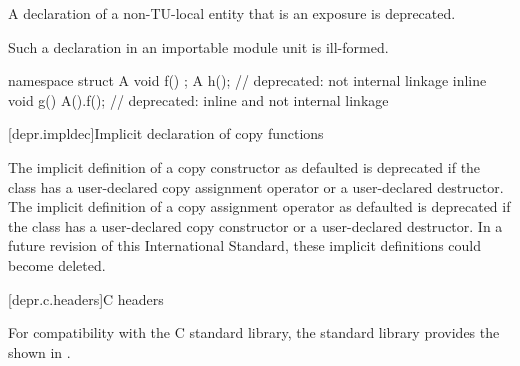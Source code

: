 \pnum
A declaration of a non-TU-local entity that is an exposure
is deprecated.
\begin{note}
Such a declaration in an importable module unit is ill-formed.
\end{note}
\begin{example}
\begin{codeblock}
namespace {
  struct A {
    void f() {}
  };
}
A h();                          // deprecated: not internal linkage
inline void g() {A().f();}      // deprecated: inline and not internal linkage
\end{codeblock}
\end{example}

[depr.impldec]{Implicit declaration of copy functions}

\pnum
The implicit definition of a copy constructor
as defaulted is deprecated if the class has
a user-declared copy assignment operator or
a user-declared destructor.
The implicit definition of a copy assignment operator
as defaulted is deprecated if the class has
a user-declared copy constructor or
a user-declared destructor.
In a future revision of this International Standard, these implicit definitions
could become deleted.

[depr.c.headers]{C headers}

\pnum
For compatibility with the
%
C standard library, the \Cpp{} standard library provides
the  shown in .

